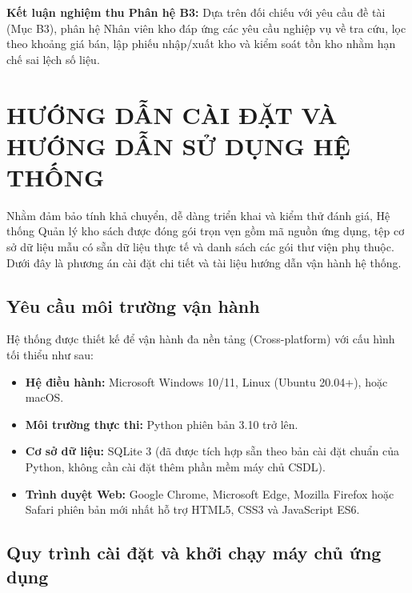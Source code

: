 \documentclass[12pt,a4paper]{article}
\begin{document}
\noindent\textbf{Kết luận nghiệm thu Phân hệ B3:} Dựa trên đối chiếu với yêu cầu đề tài (Mục B3), phân hệ Nhân viên kho đáp ứng các yêu cầu nghiệp vụ về tra cứu, lọc theo khoảng giá bán, lập phiếu nhập/xuất kho và kiểm soát tồn kho nhằm hạn chế sai lệch số liệu.

\newpage
\section{HƯỚNG DẪN CÀI ĐẶT VÀ HƯỚNG DẪN SỬ DỤNG HỆ THỐNG}
\label{sec:huong-dan-cai-dat-su-dung}

Nhằm đảm bảo tính khả chuyển, dễ dàng triển khai và kiểm thử đánh giá, Hệ thống Quản lý kho sách được đóng gói trọn vẹn gồm mã nguồn ứng dụng, tệp cơ sở dữ liệu mẫu có sẵn dữ liệu thực tế và danh sách các gói thư viện phụ thuộc. Dưới đây là phương án cài đặt chi tiết và tài liệu hướng dẫn vận hành hệ thống.

\subsection{Yêu cầu môi trường vận hành}
\label{subsec:moi-truong}

Hệ thống được thiết kế để vận hành đa nền tảng (Cross-platform) với cấu hình tối thiểu như sau:
\begin{itemize}
    \item \textbf{Hệ điều hành:} Microsoft Windows 10/11, Linux (Ubuntu 20.04+), hoặc macOS.
    \item \textbf{Môi trường thực thi:} Python phiên bản 3.10 trở lên.
    \item \textbf{Cơ sở dữ liệu:} SQLite 3 (đã được tích hợp sẵn theo bản cài đặt chuẩn của Python, không cần cài đặt thêm phần mềm máy chủ CSDL).
    \item \textbf{Trình duyệt Web:} Google Chrome, Microsoft Edge, Mozilla Firefox hoặc Safari phiên bản mới nhất hỗ trợ HTML5, CSS3 và JavaScript ES6.
\end{itemize}

\subsection{Quy trình cài đặt và khởi chạy máy chủ ứng dụng}
\label{subsec:quy-trinh-cai-dat}
\end{document}
